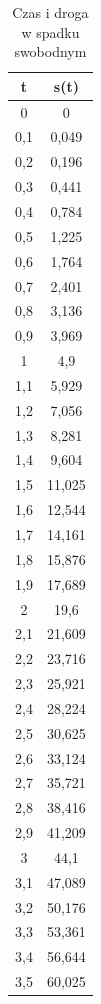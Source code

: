 \documentclass{article}
\begin{document}
\begin{center}
\begin{longtable}{|c|c|}
\caption{Czas i droga w spadku swobodnym} \\

\hline
t   & s(t)    \\ \hline 
0   & 0       \\ \hline
0,1 & 0,049   \\ \hline
0,2 & 0,196   \\ \hline
0,3 & 0,441   \\ \hline
0,4 & 0,784   \\ \hline
0,5 & 1,225   \\ \hline
0,6 & 1,764   \\ \hline
0,7 & 2,401   \\ \hline
0,8 & 3,136   \\ \hline
0,9 & 3,969   \\ \hline
1   & 4,9     \\ \hline
1,1 & 5,929   \\ \hline
1,2 & 7,056   \\ \hline
1,3 & 8,281   \\ \hline
1,4 & 9,604   \\ \hline
1,5 & 11,025  \\ \hline
1,6 & 12,544  \\ \hline
1,7 & 14,161  \\ \hline
1,8 & 15,876  \\ \hline
1,9 & 17,689  \\ \hline
2   & 19,6    \\ \hline
2,1 & 21,609  \\ \hline
2,2 & 23,716  \\ \hline
2,3 & 25,921  \\ \hline
2,4 & 28,224  \\ \hline
2,5 & 30,625  \\ \hline
2,6 & 33,124  \\ \hline
2,7 & 35,721  \\ \hline
2,8 & 38,416  \\ \hline
2,9 & 41,209  \\ \hline
3   & 44,1    \\ \hline
3,1 & 47,089  \\ \hline
3,2 & 50,176  \\ \hline
3,3 & 53,361  \\ \hline
3,4 & 56,644  \\ \hline
3,5 & 60,025  \\ \hline

\end{longtable}
\end{center}
\end{document}
